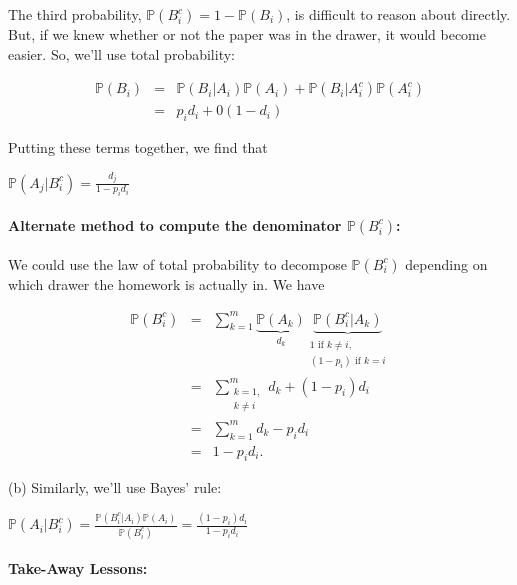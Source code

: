 \documentclass[6008notes.tex]{subfiles}
\begin{document}
The third probability, $\mathbb {P}(B_ i^ c) = 1-\mathbb {P}(B_ i)$, is difficult to reason about directly. But, if we knew whether or not the paper was in the drawer, it would become easier. So, we'll use total probability:

\begin{eqnarray}
            \mathbb{P}(B_i) &=& \mathbb{P}(B_i|A_i)\mathbb{P}(A_i) + \mathbb{P}(B_i|A_i^c)\mathbb{P}(A_i^c) \\
            &=& p_i d_i + 0 (1-d_i)
\end{eqnarray}

Putting these terms together, we find that

$\mathbb {P}(A_ j|B_ i^ c) = \frac{d_ j}{1-p_ i d_ i}$
 
\paragraph{Alternate method to compute the denominator $\mathbb {P}(B_ i^ c)$:} We could use the law of total probability to decompose $\mathbb {P}(B_ i^ c)$ depending on which drawer the homework is actually in. We have

\begin{eqnarray}
        \mathbb{P}(B_i^c) &=& \sum_{k=1}^m
                       \underbrace{\mathbb{P}(A_k)}_{d_k}
                       \underbrace{\mathbb{P}(B_i^c|A_k)}_{\substack{1\text{ if }k\ne i,\\
                                                             (1-p_i)\text{ if }k=i}} \\
                  &=& \sum_{\substack{k=1,\\
                                     k\ne i}}^m d_k
                     + (1-p_i)d_i \\
                  &=& \sum_{k=1}^m d_k - p_i d_i \\
                  &=& 1 - p_i d_i.
\end{eqnarray}

(b) Similarly, we'll use Bayes' rule:

$\mathbb {P}(A_ i | B_ i^ c) = \frac{\mathbb {P}(B_ i^ c | A_ i) \mathbb {P}(A_ i)}{\mathbb {P}(B_ i^ c)} = \frac{(1-p_ i) d_ i}{1 - p_ i d_ i}$
 
\paragraph{Take-Away Lessons:}
\end{document}
